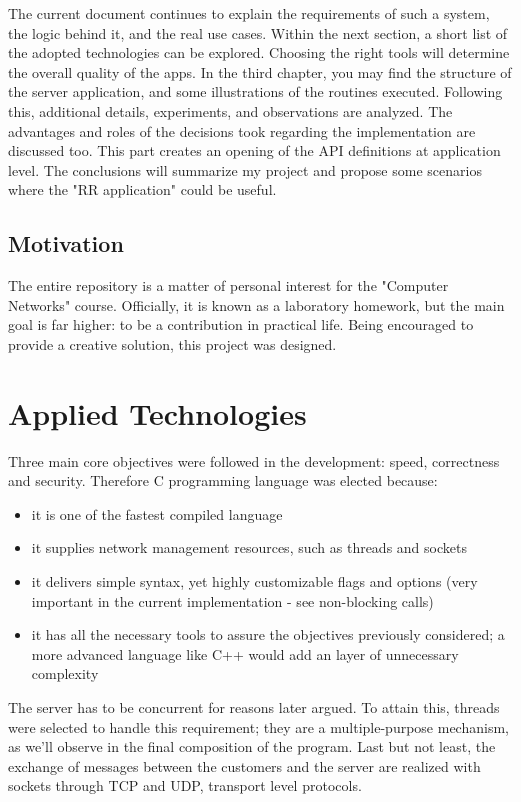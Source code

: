 \documentclass[runningheads]{llncs}
\begin{document}
The current document continues to explain the requirements of such a system, the logic behind it, and the real use cases. Within the next section, a short list of the adopted technologies can be explored. Choosing the right tools will determine the overall quality of the apps. In the third chapter, you may find the structure of the server application, and some illustrations of the routines executed. Following this, additional details, experiments, and observations are analyzed. The advantages and roles of the decisions took regarding the implementation are discussed too. This part creates an opening of the API definitions at application level. The conclusions will summarize my project and propose some scenarios where the "RR application" could be useful.

\subsection{Motivation}

The entire repository is a matter of personal interest for the "Computer Networks" course. Officially, it is known as a laboratory homework, but the main goal is far higher: to be a contribution in practical life. Being encouraged to provide a creative solution, this project was designed.

\section{Applied Technologies}

Three main core objectives were followed in the development: speed, correctness and security. Therefore C programming language was elected because:
\begin{itemize}
    \item it is one of the fastest compiled language 
    \item it supplies network management resources, such as threads and sockets
    \item it delivers simple syntax, yet highly customizable flags and options (very important in the current implementation - see non-blocking calls)
    \item it has all the necessary tools to assure the objectives previously considered; a more advanced language like C++ would add an layer of unnecessary complexity
\end{itemize}

The server has to be concurrent for reasons later argued. To attain this, threads were selected to handle this requirement; they are a multiple-purpose mechanism, as we'll observe in the final composition of the program. Last but not least, the exchange of messages between the customers and the server are realized with sockets through TCP and UDP, transport level protocols.
\end{document}
